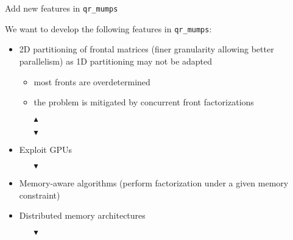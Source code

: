 \documentclass{beamer}
\newcommand{\qrm}{\texttt{qr\_mumps}\xspace}
\newcommand{\dg}[1]{\textcolor{amgreen}{#1}}
\newcommand{\dr}[1]{\textcolor{amred}{#1}}
\newcommand{\db}[1]{\textcolor{amblu}{#1}}
\begin{document}

\begin{frame}{Add new features in \qrm}

  We want to develop the following features in
  \qrm:

  \begin{itemize}
  \item \db{2D partitioning} of frontal matrices (finer granularity
    allowing better parallelism) as 1D partitioning may not be adapted
    \begin{itemize} 
    \item most fronts are overdetermined
    \item the problem is mitigated by concurrent front factorizations
    \item[\dg{$\blacktriangle$}]  
    \item[\dr{$\blacktriangledown$}]   
    \end{itemize}
  \item Exploit \db{GPUs}
    \begin{itemize}
    \item[\alert{$\blacktriangledown$}]  
    \end{itemize}      
  \item \db{Memory-aware} algorithms (perform factorization under a given
    memory constraint)
  \item \db{Distributed} memory architectures
    \begin{itemize}
    \item[\alert{$\blacktriangledown$}]  
    \end{itemize}      
  \end{itemize}

  \begin{center}
  \end{center}

\end{frame}

\end{document}
